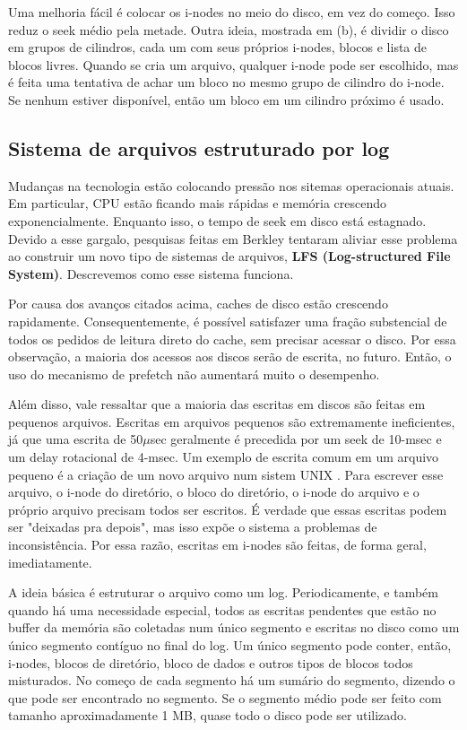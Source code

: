 \documentclass{article}
\newcommand\unix{{\color{red}UNIX} }
\begin{document}
Uma melhoria fácil é colocar os i-nodes no meio do disco, em vez do começo. Isso reduz o seek médio pela metade. Outra ideia, mostrada em (b), é dividir o disco em grupos de cilindros, cada um com seus próprios i-nodes, blocos e lista de blocos livres. Quando se cria um arquivo, qualquer i-node pode ser escolhido, mas é feita uma tentativa de achar um bloco no mesmo grupo de cilindro do i-node. Se nenhum estiver disponível, então um bloco em um cilindro próximo é usado.

\subsection{Sistema de arquivos estruturado por log}

Mudanças na tecnologia estão colocando pressão nos sitemas operacionais atuais. Em particular, CPU estão ficando mais rápidas e memória crescendo exponencialmente. Enquanto isso, o tempo de seek em disco está estagnado. Devido a esse gargalo, pesquisas feitas em Berkley tentaram aliviar esse problema ao construir um novo tipo de sistemas de arquivos, \textbf{LFS (Log-structured File System)}. Descrevemos como esse sistema funciona.

Por causa dos avanços citados acima, caches de disco estão crescendo rapidamente. Consequentemente, é possível satisfazer uma fração substencial de todos os pedidos de leitura direto do cache, sem precisar acessar o disco. Por essa observação, a maioria dos acessos aos discos serão de escrita, no futuro. Então, o uso do mecanismo de prefetch não aumentará muito o desempenho.

Além disso, vale ressaltar que a maioria das escritas em discos são feitas em pequenos arquivos. Escritas em arquivos pequenos são extremamente ineficientes, já que uma escrita de 50$\mu$sec geralmente é precedida por um seek de 10-msec e um delay rotacional de 4-msec. Um exemplo de escrita comum em um arquivo pequeno é a criação de um novo arquivo num sistem \unix. Para escrever esse arquivo, o i-node do diretório, o bloco do diretório, o i-node do arquivo e o próprio arquivo precisam todos ser escritos. É verdade que essas escritas podem ser "deixadas pra depois", mas isso expõe o sistema a problemas de inconsistência. Por essa razão, escritas em i-nodes são feitas, de forma geral, imediatamente.

A ideia básica é estruturar o arquivo como um log. Periodicamente, e também quando há uma necessidade especial, todos as escritas pendentes que estão no buffer da memória são coletadas num único segmento e escritas no disco como um único segmento contíguo no final do log. Um único segmento pode conter, então, i-nodes, blocos de diretório, bloco de dados e outros tipos de blocos todos misturados. No começo de cada segmento há um sumário do segmento, dizendo o que pode ser encontrado no segmento. Se o segmento médio pode ser feito com tamanho aproximadamente 1 MB, quase todo o disco pode ser utilizado.
\end{document}
